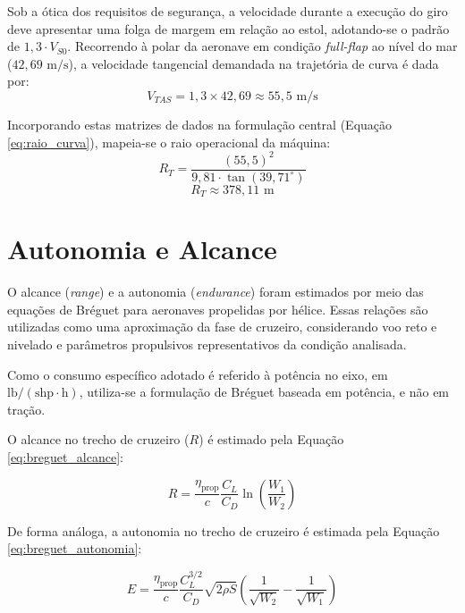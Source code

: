Sob a ótica dos requisitos de segurança, a velocidade durante a execução do giro deve apresentar uma folga de margem em relação ao estol, adotando-se o padrão de $1,3 \cdot V_{S0}$. Recorrendo à polar da aeronave em condição \textit{full-flap} ao nível do mar ($42,69 \text{ m/s}$), a velocidade tangencial demandada na trajetória de curva é dada por:
\begin{equation}
    V_{TAS} = 1,3 \times 42,69 \approx 55,5 \text{ m/s}
\end{equation}

Incorporando estas matrizes de dados na formulação central (Equação \ref{eq:raio_curva}), mapeia-se o raio operacional da máquina:
\begin{equation}
    R_{T} = \frac{(55,5)^{2}}{9,81 \cdot \tan(39,71^{\circ})}
\end{equation}
\begin{equation}
    R_{T} \approx 378,11 \text{ m}
\end{equation}


\section{Autonomia e Alcance}

O alcance (\textit{range}) e a autonomia (\textit{endurance}) foram estimados por meio das equações de Bréguet para aeronaves propelidas por hélice. Essas relações são utilizadas como uma aproximação da fase de cruzeiro, considerando voo reto e nivelado e parâmetros propulsivos representativos da condição analisada.

Como o consumo específico adotado é referido à potência no eixo, em $\mathrm{lb/(shp\cdot h)}$, utiliza-se a formulação de Bréguet baseada em potência, e não em tração.

O alcance no trecho de cruzeiro ($R$) é estimado pela Equação \ref{eq:breguet_alcance}:

\begin{equation}
    R = \frac{\eta_{\mathrm{prop}}}{c}
    \frac{C_L}{C_D}
    \ln\left(\frac{W_1}{W_2}\right)
    \label{eq:breguet_alcance}
\end{equation}

De forma análoga, a autonomia no trecho de cruzeiro é estimada pela Equação \ref{eq:breguet_autonomia}:

\begin{equation}
    E =
    \frac{\eta_{\mathrm{prop}}}{c}
    \frac{C_L^{3/2}}{C_D}
    \sqrt{2\rho S}
    \left(
    \frac{1}{\sqrt{W_2}}-
    \frac{1}{\sqrt{W_1}}
    \right)
    \label{eq:breguet_autonomia}
\end{equation}

